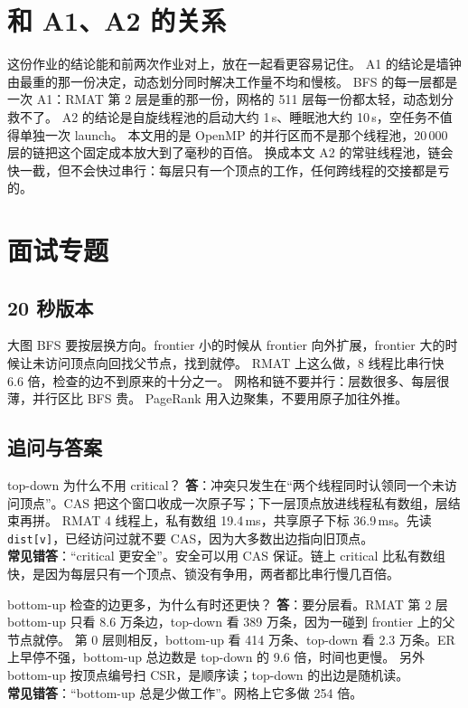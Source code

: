 \documentclass[11pt,a4paper]{ctexart}
\begin{document}
\section{和 A1、A2 的关系}

这份作业的结论能和前两次作业对上，放在一起看更容易记住。
A1 的结论是墙钟由最重的那一份决定，动态划分同时解决工作量不均和慢核。
BFS 的每一层都是一次 A1：RMAT 第 2 层是重的那一份，网格的 511 层每一份都太轻，动态划分救不了。
A2 的结论是自旋线程池的启动大约 1\,\textmu s、睡眠池大约 10\,\textmu s，空任务不值得单独一次 launch。
本文用的是 OpenMP 的并行区而不是那个线程池，20\,000 层的链把这个固定成本放大到了毫秒的百倍。
换成本文 A2 的常驻线程池，链会快一截，但不会快过串行：每层只有一个顶点的工作，任何跨线程的交接都是亏的。

\section{面试专题}
\label{sec:interview}

\subsection{20 秒版本}

大图 BFS 要按层换方向。frontier 小的时候从 frontier 向外扩展，frontier 大的时候让未访问顶点向回找父节点，找到就停。
RMAT 上这么做，8 线程比串行快 6.6 倍，检查的边不到原来的十分之一。
网格和链不要并行：层数很多、每层很薄，并行区比 BFS 贵。
PageRank 用入边聚集，不要用原子加往外推。

\subsection{追问与答案}

\begin{iqbox}{top-down 为什么不用 critical？}
\textbf{答}：冲突只发生在``两个线程同时认领同一个未访问顶点''。CAS 把这个窗口收成一次原子写；下一层顶点放进线程私有数组，层结束再拼。
RMAT 4 线程上，私有数组 19.4\,ms，共享原子下标 36.9\,ms。先读 \texttt{dist[v]}，已经访问过就不要 CAS，因为大多数出边指向旧顶点。\\
\textbf{常见错答}：``critical 更安全''。安全可以用 CAS 保证。链上 critical 比私有数组快，是因为每层只有一个顶点、锁没有争用，两者都比串行慢几百倍。
\end{iqbox}

\begin{iqbox}{bottom-up 检查的边更多，为什么有时还更快？}
\textbf{答}：要分层看。RMAT 第 2 层 bottom-up 只看 8.6 万条边，top-down 看 389 万条，因为一碰到 frontier 上的父节点就停。
第 0 层则相反，bottom-up 看 414 万条、top-down 看 2.3 万条。ER 上早停不强，bottom-up 总边数是 top-down 的 9.6 倍，时间也更慢。
另外 bottom-up 按顶点编号扫 CSR，是顺序读；top-down 的出边是随机读。\\
\textbf{常见错答}：``bottom-up 总是少做工作''。网格上它多做 254 倍。
\end{iqbox}
\end{document}
